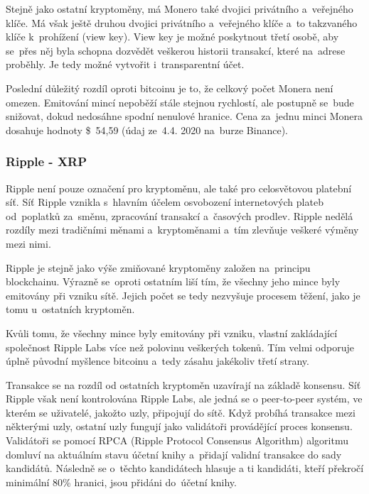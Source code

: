 \documentclass[thesis=B,czech]{FITthesis}[2019/03/21]
\begin{document}
Stejně jako ostatní kryptoměny, má Monero také dvojici privátního \linebreak a~veřejného klíče. Má však ještě druhou dvojici privátního a~veřejného klíče a~to takzvaného klíče k~prohížení (view key). View key je možné poskytnout třetí osobě, aby se~přes něj byla schopna dozvědět veškerou historii transakcí, které na~adrese proběhly. Je tedy možné vytvořit i~transparentní účet.

Poslední důležitý rozdíl oproti bitcoinu je to, že celkový počet Monera není omezen. Emitování mincí nepoběží stále stejnou rychlostí, ale postupně se~bude snižovat, dokud nedosáhne spodní nenulové hranice. \cite{alza_monero} Cena za~jednu minci Monera dosahuje hodnoty  \$~54,59 (údaj ze~4.4. 2020 na~burze Binance). \cite{binance_markets}

\subsubsection{Ripple - XRP}
Ripple není pouze označení pro kryptoměnu, ale také pro celosvětovou platební síť. Síť Ripple vznikla s~hlavním účelem osvobození internetových plateb od~poplatků za~směnu, zpracování transakcí a~časových prodlev. Ripple nedělá rozdíly mezi tradičními měnami a~kryptoměnami a~tím zlevňuje veškeré výměny mezi nimi.

Ripple je stejně jako výše zmiňované kryptoměny založen na~principu blockchainu. Výrazně se~oproti ostatním liší tím, že všechny jeho mince byly emitovány při vzniku sítě. Jejich počet se tedy nezvyšuje procesem těžení, jako je tomu u~ostatních kryptoměn.

Kvůli tomu, že všechny mince byly emitovány při vzniku, vlastní zakládající společnost Ripple Labs více než polovinu veškerých tokenů. Tím velmi odporuje úplně původní myšlence bitcoinu a~tedy zásahu jakékoliv třetí strany. \cite{alza_ripple}

Transakce se na rozdíl od ostatních kryptoměn uzavírají na základě konsensu. Síť Ripple však není kontrolována Ripple Labs, ale jedná se o peer-to-peer systém, ve kterém se uživatelé, jakožto uzly, připojují do sítě. Když probíhá transakce mezi některými uzly, ostatní uzly fungují jako validátoři provádějící proces konsensu. Validátoři se pomocí RPCA (Ripple Protocol Consensus Algorithm) algoritmu domluví na aktuálním stavu účetní knihy a~přidají validní transakce do sady kandidátů. Následně se o~těchto kandidátech hlasuje a ti kandidáti, kteří překročí minimální 80\% hranici, jsou přidáni do~účetní knihy. \cite{RPCA}
\end{document}
